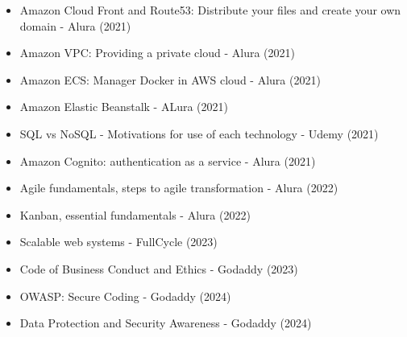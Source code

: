 \begin{itemize}
    \item Amazon Cloud Front and Route53: Distribute your files and create your own domain - Alura (2021)
    \item Amazon VPC: Providing a private cloud - Alura (2021)
    \item Amazon ECS: Manager Docker in AWS cloud - Alura (2021)
    \item Amazon Elastic Beanstalk - ALura (2021)
    \item SQL vs NoSQL - Motivations for use of each technology - Udemy (2021)
    \item Amazon Cognito: authentication as a service - Alura (2021)
    \item Agile fundamentals, steps to agile transformation - Alura (2022)
    \item Kanban, essential fundamentals - Alura (2022)
    \item Scalable web systems - FullCycle (2023)
    \item Code of Business Conduct and Ethics - Godaddy (2023)
    \item OWASP: Secure Coding - Godaddy (2024)
    \item Data Protection and Security Awareness - Godaddy (2024)
\end{itemize}
